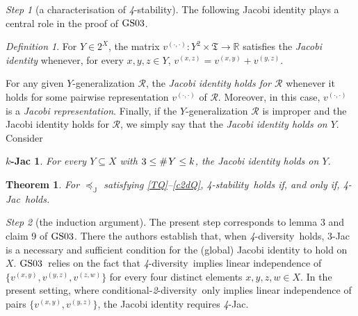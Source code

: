 \documentclass[ecta,nameyear,draft]{econsocart}
\newcommand{\countof}{\mathbin{\#}\hskip1pt}
\newcommand{\R}{\mathbb R}
\newcommand{\mc}{\mathcal}
\newcommand{\ext}{\mathrel{\mc R}}
\newcommand{\mbbt}{{\mathds {T}}}
\newcommand{\mbbtpp}{{\mathfrak{T}}}
\newcommand{\mbbj}{\mathds J}
\newcommand{\xy}{{(x, y)}}
\newcommand{\yz}{{(y,z)}}
\newcommand{\xz}{{(x,z)}}
\newcommand{\zw}{(z,w)}
\newcommand{\dd}{{(\cdot,\cdot)}}
\newcommand{\stability}{\textit{4}-\textup{{stability}}}
\newcommand{\condtwodiv}{\textup{conditional-\textit{2}-diversity}}
\newcommand{\fourdiv}{\textit{4}-\textup{diversity}}
\newcommand{\fourjac}{\textup{\textit{4}-Jac}}
\newcommand{\gsii}{$\textup{GS03}$}
\theoremstyle{plain}
\newtheorem{theorem}{Theorem}%
\newtheorem{corollary}{Corollary}[theorem]
\newtheorem*{k-jac*}{$k$-Jac}
\theoremstyle{remark}
\newtheorem{step}{Step}[section]
\newtheorem*{definition*}{Definition}
\begin{document}
\begin{appendix}
  \begin{step}[a characterisation of \stability] \label{step-stability} The
    following Jacobi identity plays a central role in the proof of \gsii.
    \begin{definition*}%
      For $Y \in 2^{X}$, the matrix $v^{\dd} : Y^{2}\times \mbbtpp \rightarrow
      \R$ satisfies the \emph{Jacobi identity} whenever, for every $x , y , z
      \in Y$, $v^{\xz} = v^{\xy} + v^{\yz}$.
    \end{definition*}
    For any given $Y$-generalization $\ext$, the \emph{Jacobi identity holds
    for $\ext$} whenever it holds for some pairwise representation $v^{\dd}$ of
    $\ext$. Moreover, in this case, $v^{\dd}$ is a \emph{Jacobi
    representation}. Finally, if the $Y$-generalization $\ext$ is improper
    and the Jacobi identity holds for $\ext$, we simply say that the
    \emph{Jacobi identity holds on $Y$}.  Consider
    \begin{k-jac*}
      For every $Y \subseteq X$ with $3 \leq \countof Y \leq k$, the Jacobi
      identity holds on $Y$.
    \end{k-jac*}
    \begin{theorem}\label{thm-foureq} For $\preceq_{\mbbj}$ satisfying
      \ref{TQ}--\ref{c2dQ}, \stability\ holds if, and only if, \fourjac\ holds.
    \end{theorem}
  \end{step}
  \begin{step}[the induction argument]\label{step-induction} The present step
    corresponds to lemma 3 and claim 9 of \gsii. There the authors establish
    that, when \fourdiv\ holds, $3$-Jac is a necessary and sufficient condition
    for the (global) Jacobi identity to hold on $X$.  \gsii\ relies on the fact
    that \fourdiv\ implies linear independence of $\{v^{\xy},v^{\yz},
    v^{\zw}\}$ for every four distinct elements $x,y,z,w \in X$. In the present
    setting, where \condtwodiv\ only implies linear independence of pairs
    $\{v^{\xy},v^{\yz}\}$, the Jacobi identity requires \fourjac.


\end{step}
\end{appendix}
\end{document}
